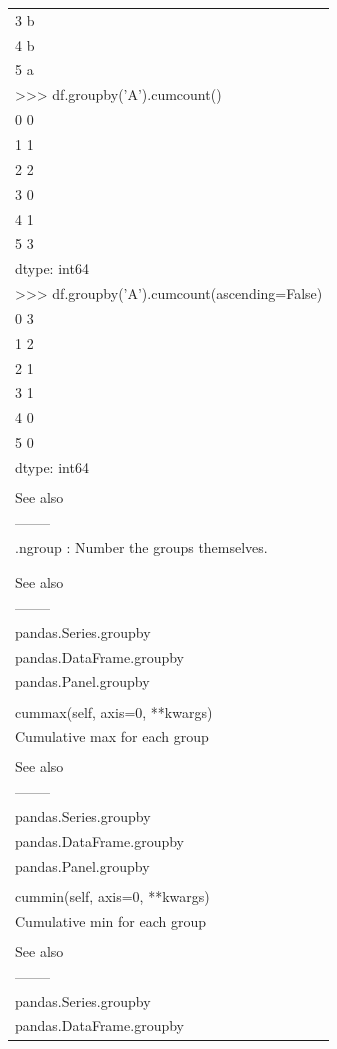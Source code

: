 \documentclass[11pt]{article}
\begin{document}
\begin{enumerate}
\begin{enumerate}
\begin{enumerate}
\begin{center}
\begin{tabular}{l}
3  b\\
4  b\\
5  a\\
>>> df.groupby('A').cumcount()\\
0    0\\
1    1\\
2    2\\
3    0\\
4    1\\
5    3\\
dtype: int64\\
>>> df.groupby('A').cumcount(ascending=False)\\
0    3\\
1    2\\
2    1\\
3    1\\
4    0\\
5    0\\
dtype: int64\\
\\
See also\\
--------\\
.ngroup : Number the groups themselves.\\
\\
\\
See also\\
--------\\
pandas.Series.groupby\\
pandas.DataFrame.groupby\\
pandas.Panel.groupby\\
\\
cummax(self, axis=0, **kwargs)\\
Cumulative max for each group\\
\\
See also\\
--------\\
pandas.Series.groupby\\
pandas.DataFrame.groupby\\
pandas.Panel.groupby\\
\\
cummin(self, axis=0, **kwargs)\\
Cumulative min for each group\\
\\
See also\\
--------\\
pandas.Series.groupby\\
pandas.DataFrame.groupby\\

\end{tabular}
\end{center}
\end{enumerate}
\end{enumerate}
\end{enumerate}
\end{document}
